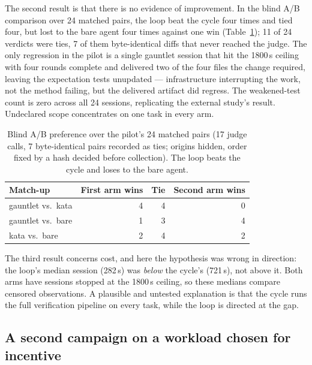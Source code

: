\documentclass{sbc2019}%
\begin{document}
The second result is that there is no evidence of improvement. In the blind A/B
comparison over 24 matched pairs, the loop beat the cycle four times and tied
four, but lost to the bare agent four times against one win
(Table~\ref{tab:gauntlet-ab}); 11 of 24 verdicts were ties, 7 of them
byte-identical diffs that never reached the judge. The only regression
in the pilot is a single gauntlet session that hit the 1800\,s ceiling with
four rounds complete and delivered two of the four files the change required,
leaving the expectation tests unupdated --- infrastructure interrupting the
work, not the method failing, but the delivered artifact did regress. The
weakened-test count is zero across all 24 sessions, replicating the external
study's result. Undeclared scope concentrates on one task in every arm.

\begin{table}[!ht]
\caption{Blind A/B preference over the pilot's 24 matched pairs (17 judge calls,
7 byte-identical pairs recorded as ties; origins hidden, order fixed by a hash decided before collection).
The loop beats the cycle and loses to the bare agent.}
\centering
\footnotesize
\begin{tabular}{@{}lrrr@{}}
\hline\hline
Match-up & First arm wins & Tie & Second arm wins \\
\hline
gauntlet vs.\ kata & 4 & 4 & 0 \\
gauntlet vs.\ bare & 1 & 3 & 4 \\
kata vs.\ bare & 2 & 4 & 2 \\
\hline\hline
\end{tabular}
\label{tab:gauntlet-ab}
\end{table}

The third result concerns cost, and here the hypothesis was wrong in
direction: the loop's median
session (282\,s) was \emph{below} the cycle's (721\,s), not above it. Both
arms have sessions stopped at the 1800\,s ceiling, so these medians compare
censored observations. A
plausible and untested explanation is that the cycle runs the full verification
pipeline on every task, while the loop is directed at the gap.

\subsection{A second campaign on a workload chosen for incentive}
\label{sec:gauntlet-campaign}
\end{document}

